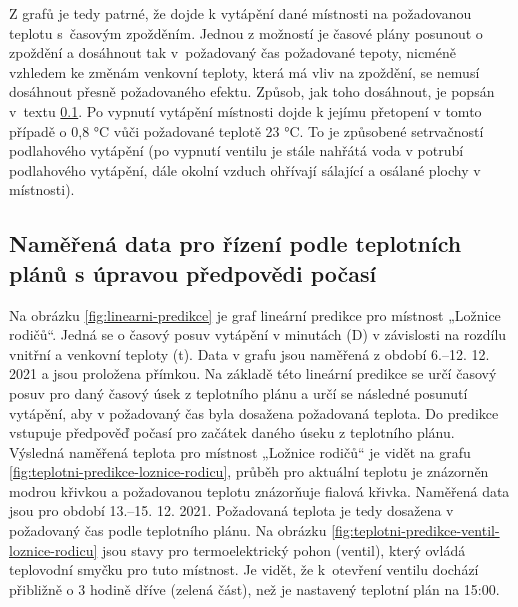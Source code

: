 Z grafů je tedy patrné, že dojde k vytápění dané místnosti na požadovanou teplotu s~časovým zpožděním. Jednou z možností je časové plány posunout o zpoždění a dosáhnout tak v~požadovaný čas požadované tepoty, nicméně vzhledem ke změnám venkovní teploty, která má vliv na zpoždění, se nemusí dosáhnout přesně požadovaného efektu. Způsob, jak toho dosáhnout, je popsán v~textu \ref{sec:namerena-data-pro-rizeni-podle-teplotnich-planu-s-upravou-predpovedi-pocasi}. Po vypnutí vytápění místnosti dojde k jejímu přetopení v tomto případě o 0,8 °C vůči požadované teplotě 23 °C. To je způsobené setrvačností podlahového vytápění (po vypnutí ventilu je stále nahřátá voda v potrubí podlahového vytápění, dále okolní vzduch ohřívají sálající a osálané plochy v místnosti).

\subsection{Naměřená data pro řízení podle teplotních plánů s úpravou předpovědi počasí}
\label{sec:namerena-data-pro-rizeni-podle-teplotnich-planu-s-upravou-predpovedi-pocasi}
Na obrázku \ref{fig:linearni-predikce} je graf lineární predikce pro místnost „Ložnice rodičů“. Jedná se o časový posuv vytápění v minutách (D) v závislosti na rozdílu vnitřní a venkovní teploty (t). Data v grafu jsou naměřená z období 6.–12. 12. 2021 a jsou proložena přímkou. Na základě této lineární predikce se určí časový posuv pro daný časový úsek z teplotního plánu a určí se následné posunutí vytápění, aby v požadovaný čas byla dosažena požadovaná teplota. Do predikce vstupuje předpověď počasí pro začátek daného úseku z teplotního plánu. Výsledná naměřená teplota pro místnost „Ložnice rodičů“ je vidět na grafu \ref{fig:teplotni-predikce-loznice-rodicu}, průběh pro aktuální teplotu je znázorněn modrou křivkou a požadovanou teplotu znázorňuje fialová křivka. Naměřená data jsou pro období 13.–15. 12. 2021. Požadovaná teplota je tedy dosažena v požadovaný čas podle teplotního plánu. Na obrázku \ref{fig:teplotni-predikce-ventil-loznice-rodicu} jsou stavy pro termoelektrický pohon (ventil), který ovládá teplovodní smyčku pro tuto místnost. Je vidět, že k~otevření ventilu dochází přibližně o 3 hodině dříve (zelená část), než je nastavený teplotní plán na 15:00.  

